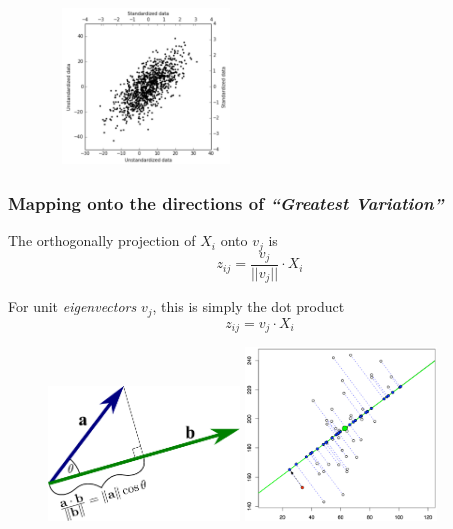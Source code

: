\documentclass[xcolor={dvipsnames}]{beamer}
\begin{document}
{{\begin{figure}
\centering
$\quad$\includegraphics[width=1.75in]{stuff/covVcor.png}
\end{figure}}


}







\frame
{
 \frametitle{Mapping onto the directions of  \emph{``Greatest Variation''}}
 
 \hspace{.5em}
 
 The orthogonally projection of $X_i$ onto $v_j$ is 
 $$z_{ij} = \frac{v_j}{||v_j||} \cdot X_i$$
 
For unit \emph{eigenvectors} $v_j$, this is simply the dot product
 $$z_{ij} = v_j \cdot X_i$$

\vspace{-2.5em}

\begin{figure}
\hspace*{-2em}\includegraphics[width=2in, angle=21]{stuff/dot_product_projection.png}
\includegraphics[width=2in]{stuff/pca_figure1.jpg}
\end{figure}
 
}
\end{document}
